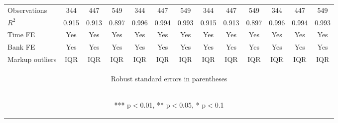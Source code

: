 \documentclass[]{article}
\begin{document}
\begin{center}
\begin{tabular}{lcccccccccccc}
Observations & 344 & 447 & 549 & 344 & 447 & 549 & 344 & 447 & 549 & 344 & 447 & 549 \\
$R^2$ & 0.915 & 0.913 & 0.897 & 0.996 & 0.994 & 0.993 & 0.915 & 0.913 & 0.897 & 0.996 & 0.994 & 0.993 \\
Time FE & Yes & Yes & Yes & Yes & Yes & Yes & Yes & Yes & Yes & Yes & Yes & Yes \\
Bank FE & Yes & Yes & Yes & Yes & Yes & Yes & Yes & Yes & Yes & Yes & Yes & Yes \\
 Markup outliers & IQR & IQR & IQR & IQR & IQR & IQR & IQR & IQR & IQR & IQR & IQR & IQR \\ \hline
\multicolumn{13}{c}{\begin{footnotesize} Robust standard errors in parentheses\end{footnotesize}} \\
\multicolumn{13}{c}{\begin{footnotesize} *** p$<$0.01, ** p$<$0.05, * p$<$0.1\end{footnotesize}} \\
\end{tabular}
\end{center}
\end{document}
